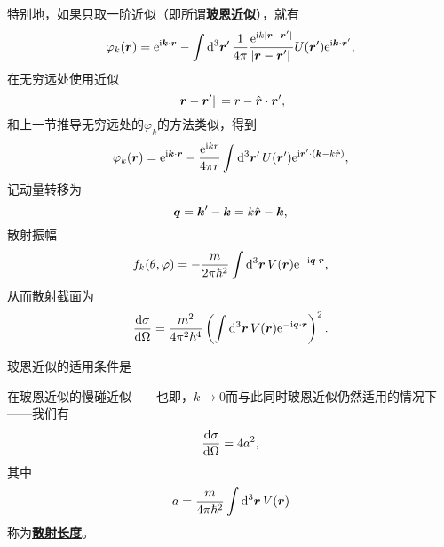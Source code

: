\documentclass[UTF8, a4paper]{ctexart}
\newcommand*{\ee}{\mathrm{e}}
\newcommand*{\ii}{\mathrm{i}}
\newcommand{\concept}[1]{\underline{\textbf{#1}}}
\begin{document}
特别地，如果只取一阶近似（即所谓\concept{玻恩近似}），就有
\begin{equation}
    \varphi_k(\vb*{r}) = \ee^{\ii \vb*{k} \cdot \vb*{r}} - \int \dd[3]{\vb*{r}'} \frac{1}{4\pi} \frac{\ee^{\ii k \abs*{\vb*{r} - \vb*{r}'}}}{\abs*{\vb*{r} - \vb*{r}'}} U(\vb*{r}') \ee^{\ii \vb*{k} \cdot \vb*{r}'},
\end{equation}
在无穷远处使用近似
\[
    \abs*{\vb*{r}-\vb*{r}'} = r - \hat{\vb*{r}} \cdot \vb*{r}',
\]
和上一节推导无穷远处的$\varphi_k$的方法类似，得到
\[
    \varphi_k(\vb*{r}) = \ee^{\ii \vb*{k} \cdot \vb*{r}} - \frac{\ee^{\ii k r}}{4 \pi r} \int \dd[3]{\vb*{r}'} U(\vb*{r}') \ee^{\ii \vb*{r}' \cdot (\vb*{k} - k \hat{\vb*{r}})},
\]
记动量转移为
\begin{equation}
    \vb*{q} = \vb*{k}' - \vb*{k} = k \hat{\vb*{r}} - \vb*{k},
\end{equation}
散射振幅
\begin{equation}
    f_k(\theta, \varphi) = - \frac{m}{2\pi \hbar^2} \int \dd[3]{\vb*{r}} V(\vb*{r}) \ee^{- \ii \vb*{q} \cdot \vb*{r}}, 
\end{equation}
从而散射截面为
\begin{equation}
    \dv{\sigma}{\Omega} = \frac{m^2}{4\pi^2 \hbar^4} \left( \int \dd[3]{\vb*{r}} V(\vb*{r}) \ee^{- \ii \vb*{q} \cdot \vb*{r}} \right)^2.
\end{equation}

玻恩近似的适用条件是

在玻恩近似的慢碰近似——也即，$k \to 0$而与此同时玻恩近似仍然适用的情况下——我们有
\begin{equation}
    \dv{\sigma}{\Omega} = 4 a^2,
\end{equation}
其中
\begin{equation}
    a = \frac{m}{4\pi \hbar^2} \int \dd[3]{\vb*{r}} V(\vb*{r})
\end{equation}
称为\concept{散射长度}。
\end{document}
